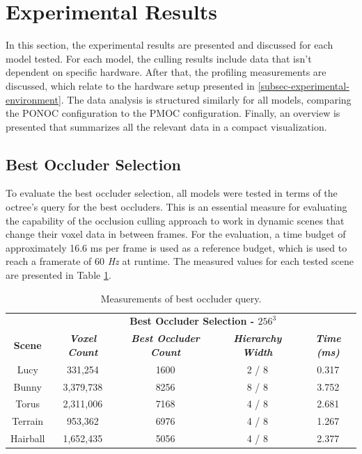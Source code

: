 \section{Experimental Results}

In this section, the experimental results are presented and discussed for each model tested.
For each model, the culling results include data that isn't dependent on specific hardware. 
After that, the profiling measurements are discussed, which relate to the hardware setup 
presented in \ref{subsec-experimental-environment}. The data analysis is structured similarly 
for all models, comparing the \ac{PONOC} configuration to the \ac{PMOC} configuration. Finally, 
an overview is presented that summarizes all the relevant data in a compact visualization.


\subsection*{Best Occluder Selection}

To evaluate the best occluder selection, all models were tested in terms of the octree's query 
for the best occluders. This is an essential measure for evaluating the capability of the 
occlusion culling approach to work in dynamic scenes that change their voxel data in between 
frames. For the evaluation, a time budget of approximately 16.6 ms per frame is used as a 
reference budget, which is used to reach a framerate of 60 \emph{Hz} at runtime. The measured 
values for each tested scene are presented in Table \ref{tab:best-occluder-query}. 

\begin{table}[htbp]
  \begin{center}
    \begin{tabular}{|c|c|c|c|c|}
      \hline
      \textbf{}&\multicolumn{4}{|c|}{\textbf{Best Occluder Selection - $256^3$}} \\
      \cline{2-5} 
      \textbf{Scene} & \textbf{\textit{Voxel Count}}& \textbf{\textit{Best Occluder Count}}& \textbf{\textit{Hierarchy Width}}& \textbf{\textit{Time (ms)}} \\
      \hline
      Lucy        & 331,254   & 1600 & 2 / 8  & 0.317 \\
      Bunny       & 3,379,738 & 8256 & 8 / 8  & 3.752 \\
      Torus       & 2,311,006 & 7168 & 4 / 8  & 2.681 \\
      Terrain     & 953,362   & 6976 & 4 / 8  & 1.267 \\
      Hairball    & 1,652,435 & 5056 & 4 / 8  & 2.377 \\
      \hline
    \end{tabular}
    \caption{Measurements of best occluder query.}
  \label{tab:best-occluder-query}
  \end{center}
\end{table}


